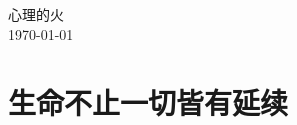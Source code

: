 \documentclass[UTF8, 12pt, a4paper]{ctexrep} %
\begin{document}
\begin{titlepage}
    \centering
    {\sffamily\fontsize{40}{50}心理的火}\\
    {\today}
\end{titlepage}


\section{生命不止一切皆有延续}
\newpage
\end{document}
